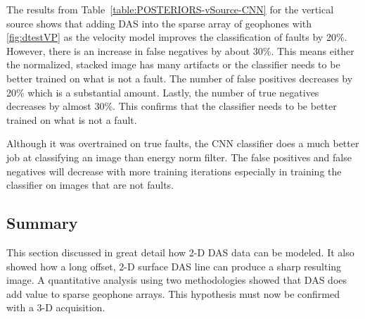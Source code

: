 The results from Table~\ref{table:POSTERIORS-vSource-CNN} for the vertical source shows that adding DAS into the sparse array of geophones with \ref{fig:dtestVP} as the velocity model improves the classification of faults by 20\%. However, there is an increase in false negatives by about 30\%. This means either the normalized, stacked image has many artifacts or the classifier needs to be better trained on what is not a fault. The number of false positives decreases by 20\% which is a substantial amount. Lastly, the number of true negatives decreases by almost 30\%. This confirms that the classifier needs to be better trained on what is not a fault.

Although it was overtrained on true faults, the CNN classifier does a much better job at classifying an image than energy norm filter. The false positives and false negatives will decrease with more training iterations especially in training the classifier on images that are not faults.

\subsection{Summary}
This section discussed in great detail how 2-D DAS data can be modeled. It also showed how a long offset, 2-D surface DAS line can produce a sharp resulting image. A quantitative analysis using two methodologies showed that DAS does add value to sparse geophone arrays. This hypothesis must now be confirmed with a 3-D acquisition.

